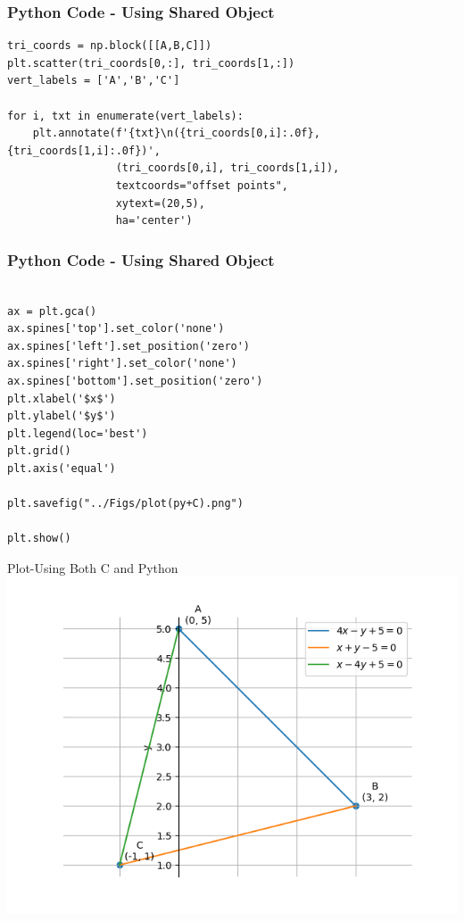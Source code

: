 \documentclass{beamer}
\begin{document}
\begin{frame}[fragile]
    \frametitle{Python Code - Using Shared Object}
    \begin{lstlisting}
tri_coords = np.block([[A,B,C]])
plt.scatter(tri_coords[0,:], tri_coords[1,:])
vert_labels = ['A','B','C']

for i, txt in enumerate(vert_labels):
    plt.annotate(f'{txt}\n({tri_coords[0,i]:.0f}, {tri_coords[1,i]:.0f})',
                 (tri_coords[0,i], tri_coords[1,i]), 
                 textcoords="offset points", 
                 xytext=(20,5), 
                 ha='center') 

    \end{lstlisting}
    
\end{frame}

\begin{frame}[fragile]
    \frametitle{Python Code - Using Shared Object}
    \begin{lstlisting}
    
ax = plt.gca()
ax.spines['top'].set_color('none')
ax.spines['left'].set_position('zero')
ax.spines['right'].set_color('none')
ax.spines['bottom'].set_position('zero')
plt.xlabel('$x$')
plt.ylabel('$y$')
plt.legend(loc='best')
plt.grid() 
plt.axis('equal')

plt.savefig("../Figs/plot(py+C).png")

plt.show()

\end{lstlisting}
\end{frame}

\begin{frame}{Plot-Using Both C and Python}
    \centering
    \includegraphics[width=\columnwidth, height=0.8\textheight, keepaspectratio]{Figs/plot(py+C).png}     
\end{frame}
\end{document}
